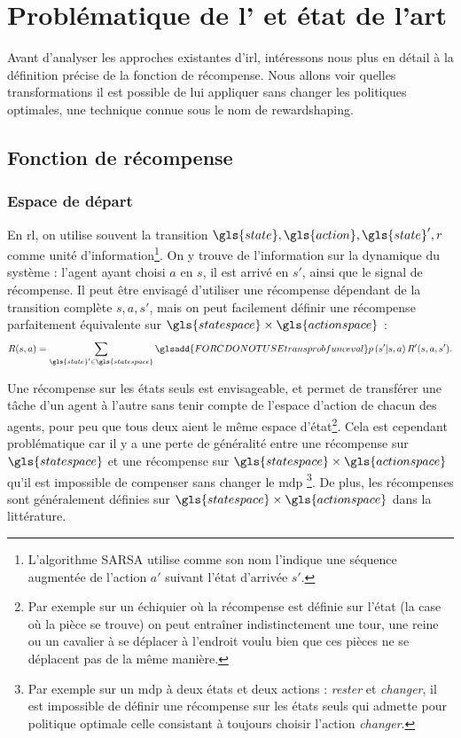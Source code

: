 \documentclass[frenchb,a4paper,justified,notoc]{tufte-book}
\newcommand{\state}{\gls{state}}
\newcommand{\action}{\gls{action}}
\newcommand{\statespace}{\gls{statespace}}
\newcommand{\actionspace}{\gls{actionspace}}
\newcommand{\transprobfunceval}[3]{\ensuremath{\glsadd{FORCDONOTUSEtransprobfunceval}p\left(#3|#1,#2\right)}}
\begin{document}
\chapter{Problématique de l' et état de l'art}
\label{sec-3}
\label{hier-etatdelart}

  Avant d'analyser les approches existantes d'\gls{irl}, intéressons nous plus en détail à la définition précise de la fonction de récompense. Nous allons voir quelles transformations il est possible de lui appliquer sans changer les politiques optimales, une technique connue sous le nom de \gls{rewardshaping}. 
\section{Fonction de récompense}
\label{sec-3-1}
\label{hier-recompense}
\subsection{Espace de départ}
\label{sec-3-1-1}

En \gls{rl}, on utilise souvent la transition $\state,\action,\state',r$ comme unité d'information\footnote{L'algorithme SARSA utilise comme son nom l'indique une séquence augmentée de l'action $a'$ suivant l'état d'arrivée $s'$.
 }. On y trouve de l'information sur la dynamique du système : l'agent ayant choisi $a$ en $s$, il est arrivé en $s'$, ainsi que le signal de récompense. Il peut être envisagé d'utiliser une récompense dépendant de la transition complète $s,a,s'$, mais on peut facilement définir une récompense parfaitement équivalente sur $\statespace\times \actionspace$ :
\begin{equation}
R(s,a) = \sum_{\state'\in \statespace}\transprobfunceval{s}{a}{s'}R'(s,a,s').
\end{equation}

Une récompense sur les états seuls est envisageable, et permet de transférer une tâche d'un agent à l'autre sans tenir compte de l'espace d'action de chacun des agents, pour peu que tous deux aient le même espace d'état\footnote{Par exemple sur un échiquier où la récompense est définie sur l'état (la case où la pièce se trouve) on peut entraîner indistinctement une tour, une reine ou un cavalier à se déplacer à l'endroit voulu bien que ces pièces ne se déplacent pas de la même manière.
 }. Cela est cependant problématique car il y a une perte de généralité entre une récompense sur $\statespace$ et une récompense sur $\statespace\times \actionspace$ qu'il est impossible de compenser sans changer le \gls{mdp} \footnote{Par exemple sur un \gls{mdp} à deux états et deux actions : \emph{rester} et \emph{changer}, il est impossible de définir une récompense sur les états seuls qui admette pour politique optimale celle consistant à toujours choisir l'action \emph{changer}.
 }. De plus, les récompenses sont généralement définies sur $\statespace\times\actionspace$ dans la littérature.
\end{document}
